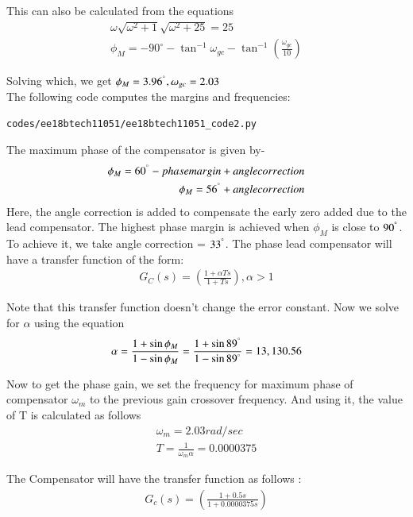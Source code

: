 \begin{enumerate}[label=\thesection.\arabic*.,ref=\thesection.\theenumi]
This can also be calculated from the equations
\begin{align}
    \omega \sqrt{\omega^2 + 1} \sqrt{\omega^2 + 25} = 25\\
    \phi_{M} = -90^{\circ} - \tan^{-1}{\omega_{gc}} - \tan^{-1}({\frac{\omega_{gc}}{10}})
\end{align}

Solving which, we get $\phi_{M} =  3.96^{\degree} , \omega_{gc} =  2.03$\\
The following code computes the margins and frequencies:
\begin{lstlisting}
codes/ee18btech11051/ee18btech11051_code2.py
\end{lstlisting}

The maximum phase of the compensator is given by-
\begin{align}
    \phi_{M} = 60^{\degree} - phase margin + angle correction\\
    \phi_{M} = 56^{\degree} + angle correction
\end{align}
Here, the angle correction is added to compensate the early zero added due to the lead compensator. The highest phase margin is achieved when $\phi_{M}$ is close to $90^{\degree}$. To achieve it, we take angle correction = $33^{\degree}$.
The phase lead compensator will have a transfer function of the form:
\begin{align}
    G_{C}(s) = \left(\frac{1+\alpha Ts} {1+Ts}\right), \alpha >1
\end{align}


Note that this transfer function doesn't change the error constant.
Now we solve for $\alpha$ using the equation
\begin{align}
    \alpha = \frac{1+\sin{\phi_{M}}}{1-\sin{\phi_{M}}} = \frac{1+\sin{89^{\degree}}}{1-\sin{89^{\degree}}} = 13,130.56
\end{align}

Now to get the phase gain, we set the frequency for maximum phase of compensator $\omega_{m}$ to the previous gain crossover frequency. And using it, the value of T is calculated as follows
\begin{align}
    \omega_{m} = 2.03 rad/sec \\
    T = \frac{1}{\omega_{m}\alpha} = 0.0000375
\end{align}


The Compensator will have the transfer function as follows :
\begin{align}
G_{c}(s) = \left(\frac{1 + 0.5s}{1 + 0.0000375s}\right)
\end{align}


\end{enumerate}
